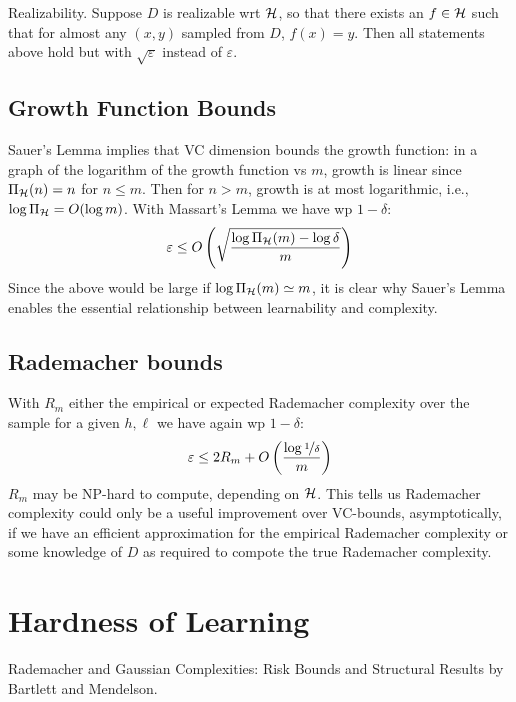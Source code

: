 \documentclass{article}
\begin{document}
Realizability. Suppose $D$ is realizable wrt $\mathcal{H}$, so that there exists an $f\in\mathcal{H}$ such that for almost any $(x,y)$ sampled from $D$, $f(x)=y$. Then all statements above hold but with $\sqrt{\varepsilon}$ instead of $\varepsilon$.


\subsection{Growth Function Bounds}

Sauer's Lemma implies that VC dimension bounds the growth function: in a graph of the logarithm of the growth function vs $m$, growth is linear since $\Pi_{\mathcal{H}}(n)=n$ for $n\le m$. Then for $n>m$, growth is at most logarithmic, i.e., $\log\Pi_{\mathcal{H}}=O(\log m)$. With Massart's Lemma we have wp $1-\delta$:
$$
\varepsilon\le O\left({\sqrt{\frac{\log\Pi_{\mathcal{H}}(m)-\log\delta}{m}}}\right)
$$
Since the above would be large if $\log\Pi_{\mathcal{H}}(m)\simeq m$, it is clear why Sauer's Lemma enables the essential relationship between learnability and complexity.

\subsection{Rademacher bounds}

With $R_m$ either the empirical or expected Rademacher complexity over the sample for a given $h,\ell$ we have again wp $1-\delta$:
$$
\varepsilon\le 2R_m+O\left({\frac{\log\nicefrac{1}{\delta}}{m}}\right)
$$
$R_m$ may be NP-hard to compute, depending on $\mathcal{H}$. This tells us Rademacher complexity could only be a useful improvement over VC-bounds, asymptotically, if we have an efficient approximation for the empirical Rademacher complexity or some knowledge of $D$ as required to compote the true Rademacher complexity.

\section{Hardness of Learning}

Rademacher and Gaussian Complexities: Risk Bounds and Structural Results by Bartlett and Mendelson.
\end{document}

